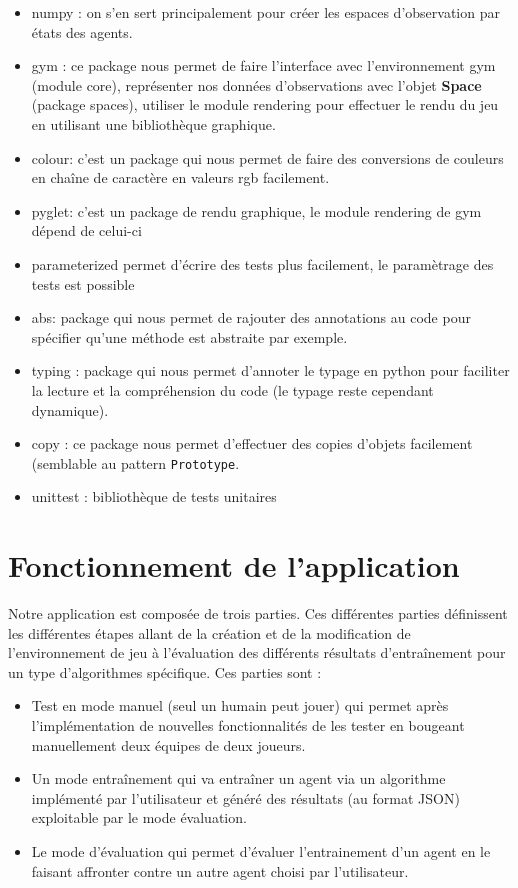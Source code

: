 \documentclass[11pt, a4paper]{article}
\begin{document}
	\begin{itemize}
		\item numpy \cite{numpy}: on s'en sert principalement pour créer les espaces d'observation par états des agents.
		\item gym \cite{openaigym}: ce package nous permet de faire l'interface avec l'environnement gym (module core), représenter nos données d'observations
		avec l'objet \textbf{Space} (package spaces), utiliser le module rendering pour effectuer le rendu du jeu en utilisant une bibliothèque graphique.
		\item colour: c'est un package qui nous permet de faire des conversions de couleurs en chaîne de caractère en valeurs rgb facilement.
		\item pyglet: c'est un package de rendu graphique, le module rendering de gym dépend de celui-ci
		\item parameterized \cite{parameterized} permet d'écrire des tests plus facilement, le paramètrage des tests est possible
		\item abs: package qui nous permet de rajouter des annotations au code pour spécifier qu'une méthode est abstraite par exemple.
		\item typing \cite{typing}: package qui nous permet d'annoter le typage en python pour faciliter la lecture et la compréhension du code (le typage reste cependant dynamique).
		\item copy \cite{copy}: ce package nous permet d'effectuer des copies d'objets facilement (semblable au pattern \texttt{Prototype}.
		\item unittest \cite{unittest}: bibliothèque de tests unitaires

	\end{itemize}



	\section{Fonctionnement de l'application}
	Notre application est composée de trois parties. Ces différentes parties définissent les différentes étapes allant de la création et de la modification de l'environnement de jeu à l'évaluation des différents résultats d'entraînement pour un type d'algorithmes spécifique. Ces parties sont :
	\begin{itemize}
		\item Test en mode manuel (seul un humain peut jouer) qui permet après l'implémentation de nouvelles fonctionnalités de les tester en bougeant manuellement deux équipes de deux joueurs.
		\item Un mode entraînement qui va entraîner un agent via un algorithme implémenté par l'utilisateur et généré des résultats (au format JSON) exploitable par le mode évaluation.
		\item Le mode d'évaluation qui permet d'évaluer l'entrainement d'un agent en le faisant affronter contre un autre agent choisi par l'utilisateur.
	\end{itemize}
\end{document}
